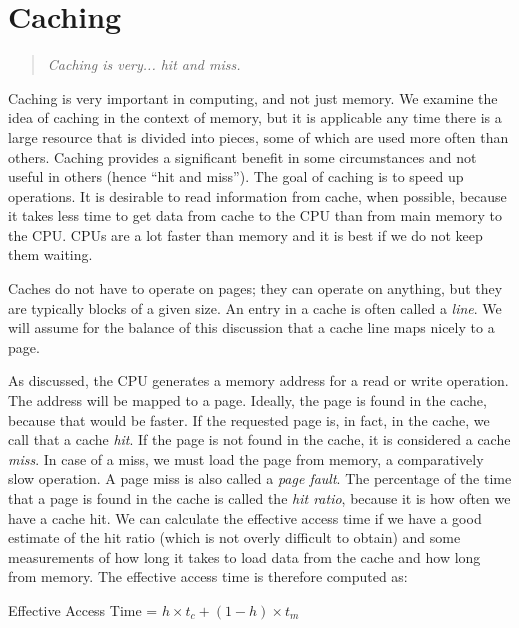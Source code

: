 




\section*{Caching}
\begin{quote}
\textit{Caching is very... hit and miss.}
\end{quote}


Caching is very important in computing, and not just memory. We examine the idea of caching in the context of memory, but it is applicable any time there is a large resource that is divided into pieces, some of which are used more often than others. Caching provides a significant benefit in some circumstances and not useful in others (hence ``hit and miss''). The goal of caching is to speed up operations. It is desirable to read information from cache, when possible, because it takes less time to get data from cache to the CPU than from main memory to the CPU. CPUs are a lot faster than memory and it is best if we do not keep them waiting.

Caches do not have to operate on pages; they can operate on anything, but they are typically blocks of a given size. An entry in a cache is often called a \textit{line}. We will assume for the balance of this discussion that a cache line maps nicely to a page.

As discussed, the CPU generates a memory address for a read or write operation. The address will be mapped to a page. Ideally, the page is found in the cache, because that would be faster. If the requested page is, in fact,  in the cache, we call that a cache \textit{hit}. If the page is not found in the cache, it is considered a cache \textit{miss}. In case of a miss, we must load the page from memory, a comparatively slow operation. A page miss is also called a \textit{page fault}. The percentage of the time that a page is found in the cache is called the \textit{hit ratio}, because it is how often we have a cache hit. We can calculate the effective access time if we have a good estimate of the hit ratio (which is not overly difficult to obtain) and some measurements of how long it takes to load data from the cache and how long from memory. The effective access time is therefore computed as:

\begin{center}
Effective Access Time = $h \times t_{c} + (1-h) \times t_{m}$
\end{center}

